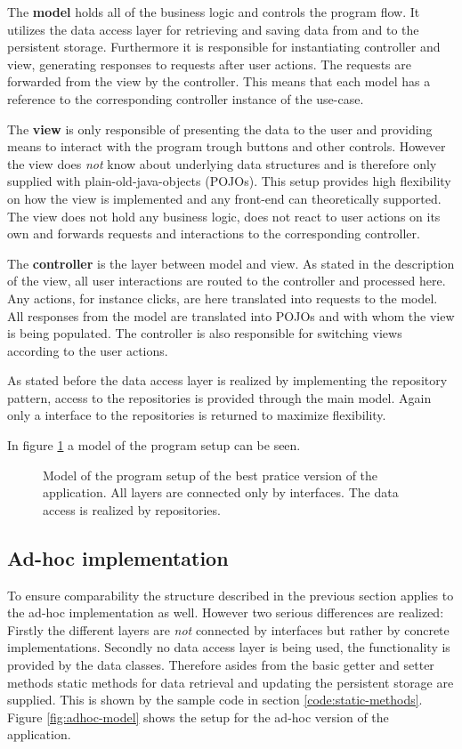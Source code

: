 The \textbf{model} holds all of the business logic and controls the program flow. It utilizes the data access layer for retrieving and saving data from and to the persistent storage. Furthermore it is responsible for instantiating controller and view, generating responses to requests after user actions. The requests are forwarded from the view by the controller. This means that each model has a reference to the corresponding controller instance of the use-case. 

The \textbf{view} is only responsible of presenting the data to the user and providing means to interact with the program trough buttons and other controls. However the view does \emph{not} know about underlying data structures and is therefore only supplied with plain-old-java-objects (POJOs). This setup provides high flexibility on how the view is implemented and any front-end can theoretically supported. The view does not hold any business logic, does not react to user actions on its own and forwards requests and interactions to the corresponding controller. 

The \textbf{controller} is the layer between model and view. As stated in the description of the view, all user interactions are routed to the controller and processed here. Any actions, for instance clicks, are here translated into requests to the model. All responses from the model are translated into POJOs and with whom the view is being populated. The controller is also responsible for switching views according to the user actions.

As stated before the data access layer is realized by implementing the repository pattern, access to the repositories is provided through the main model.  Again only a interface to the repositories is returned to maximize flexibility.

In figure \ref{fig:bp-model} a model of the program setup can be seen. 

\begin{figure}
	\label{fig:bp-model}
	\caption{Model of the program setup of the best pratice version of the application. All layers are connected only by interfaces. The data access is realized by repositories.}
\end{figure}

\subsection{Ad-hoc implementation}
\label{sec:ad-hoc}
To ensure comparability the structure described in the previous section applies to the ad-hoc implementation as well. However two serious differences are realized: Firstly the different layers are \emph{not} connected by interfaces but rather by concrete implementations. Secondly no data access layer is being used, the functionality is provided by the data classes. Therefore asides from the basic getter and setter methods static methods for data retrieval and updating the persistent storage are supplied. This is shown by the sample code in section \ref{code:static-methods}. Figure \ref{fig:adhoc-model} shows the setup for the ad-hoc version of the application. 


